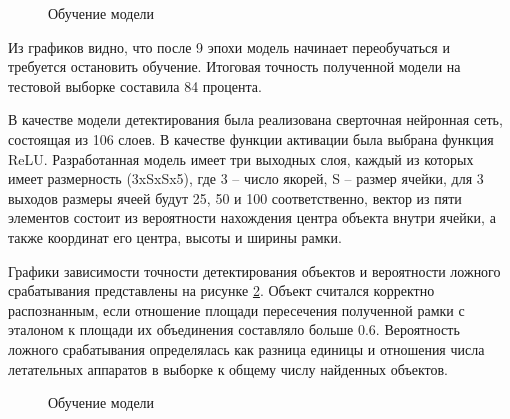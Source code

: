 \begin{figure}[H]
	\begin{center}
		\caption{Обучение модели}
		\label{img:model_training}
	\end{center}
\end{figure}

Из графиков видно, что после 9 эпохи модель начинает переобучаться и требуется остановить обучение. Итоговая точность полученной модели на тестовой выборке составила 84 процента.

В качестве модели детектирования была реализована сверточная нейронная сеть, состоящая из 106 слоев. В качестве функции активации была выбрана функция ReLU. Разработанная модель имеет три выходных слоя, каждый из которых имеет размерность (3xSxSx5), где 3 -- число якорей, S -- размер ячейки, для 3 выходов размеры ячеей будут 25, 50 и 100 соответственно, вектор из пяти элементов состоит из вероятности нахождения центра объекта внутри ячейки, а также координат его центра, высоты и ширины рамки.

Графики зависимости точности детектирования объектов и вероятности ложного срабатывания представлены на рисунке \ref{img:yolo_training}. Объект считался корректно распознанным, если отношение площади пересечения полученной рамки с эталоном к площади их объединения составляло больше 0.6. Вероятность ложного срабатывания определялась как разница единицы и отношения числа летательных аппаратов в выборке к общему числу найденных объектов.

\begin{figure}[H]
	\begin{center}
		\caption{Обучение модели}
		\label{img:yolo_training}
	\end{center}
\end{figure}



